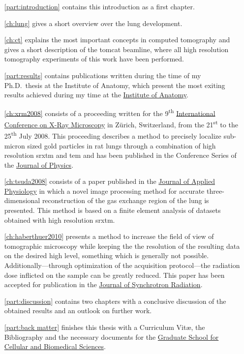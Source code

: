 \begin{itemize}
	\item [\autoref{part:introduction}] contains this introduction as a first chapter.
		
		\autoref{ch:lung} gives a short overview over the lung development.
	
		\autoref{ch:ct} explains the most important concepts in computed tomography and gives a short description of the \ac{tomcat} beamline, where all high resolution tomography experiments of this work have been performed.
	\item [\autoref{part:results}] contains publications written during the time of my Ph.D.\ thesis at the Institute of Anatomy, which present the most exiting results achieved during my time at the \href{http://www.ana.unibe.ch/index_e.jsp}{Institute of Anatomy}.
	
		\autoref{ch:xrm2008} consists of a proceeding written for the 9\textsuperscript{th} \href{http://xrm2008.web.psi.ch/}{International Conference on X-Ray Microscopy} in Zürich, Switzerland, from the 21\textsuperscript{st} to the 25\textsuperscript{th} July 2008. This proceeding describes a method to precisely localize sub-micron sized gold particles in rat lungs through a combination of high resolution \acl{srxtm} and \acl{tem} and has been published in the Conference Series of the \href{http://iopscience.iop.org/1742-6596/}{Journal of Physics}.
		
		\autoref{ch:tsuda2008} consists of a paper published in the \href{http://jap.physiology.org/}{Journal of Applied Physiology} in which a novel image processing method for accurate three-dimensional reconstruction of the gas exchange region of the lung is presented. This method is based on a finite element analysis of datasets obtained with high resolution \acl{srxtm}.

		\autoref{ch:haberthuer2010} presents a method to increase the field of view of tomographic microscopy while keeping the the resolution of the resulting data on the desired high level, something which is generally not possible. Additionally---through optimization of the acquisition protocol---the radiation dose inflicted on the sample can be greatly reduced. This paper has been accepted for publication in the \href{http://journals.iucr.org/s/}{Journal of Synchrotron Radiation}.

	\item [\autoref{part:discussion}] contains two chapters with a conclusive discussion of the obtained results and an outlook on further work.
	\item [\autoref{part:back matter}] finishes this thesis with a Curriculum Vit\ae, the Bibliography and the necessary documents for the \href{http://www.gcb.unibe.ch}{Graduate School for Cellular and Biomedical Sciences}.
\end{itemize}